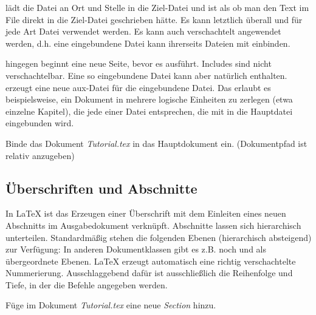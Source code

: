  lädt die Datei an Ort und Stelle in die Ziel-Datei und ist als ob man den Text im File direkt in die Ziel-Datei geschrieben hätte. Es kann letztlich überall und für jede Art Datei verwendet werden. Es kann auch verschachtelt angewendet werden, d.h. eine eingebundene Datei kann ihrerseits Dateien mit  einbinden.\vspace{6pt}

 hingegen beginnt eine neue Seite, bevor es  ausführt. Includes sind nicht verschachtelbar. Eine so eingebundene Datei kann aber natürlich  enthalten.  erzeugt eine neue aux-Datei für die eingebundene Datei. Das erlaubt es beispielsweise, ein Dokument in mehrere logische Einheiten zu zerlegen (etwa einzelne Kapitel), die jede einer Datei entsprechen, die mit  in die Hauptdatei eingebunden wird.\\
\begin{aufgabe}
	Binde das Dokument \textit{\glqq Tutorial.tex\grqq{}} in das Hauptdokument ein. (Dokumentpfad ist relativ anzugeben)
\end{aufgabe}

\subsection{Überschriften und Abschnitte}
In \LaTeX{} ist das Erzeugen einer Überschrift mit dem Einleiten eines neuen Abschnitts im Ausgabedokument verknüpft. Abschnitte lassen sich hierarchisch unterteilen. Standardmäßig stehen die folgenden Ebenen (hierarchisch absteigend) zur Verfügung:
\setcounter{section}{0}
\setcounter{section}{3}
\setcounter{subsection}{3}
In anderen Dokumentklassen gibt es z.B. noch  und  als übergeordnete Ebenen. \LaTeX{} erzeugt automatisch eine richtig verschachtelte Nummerierung. Ausschlaggebend dafür ist ausschließlich die Reihenfolge und Tiefe, in der die Befehle angegeben werden.\\
\begin{aufgabe}
	Füge im Dokument \textit{\glqq Tutorial.tex\grqq{}} eine neue \textit{Section} hinzu. 
\end{aufgabe}


